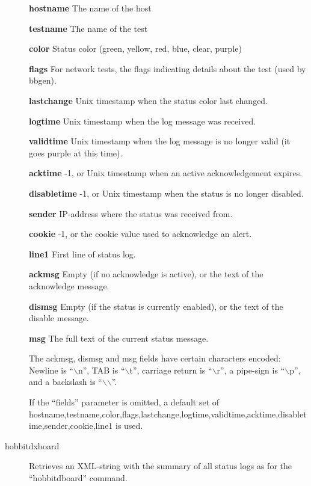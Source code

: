 \begin{description}
 \textbf{hostname}
 The name of the host 


 \textbf{testname}
 The name of the test 


 \textbf{color}
 Status color (green, yellow, red, blue, clear, purple) 


 \textbf{flags}
 For network tests, the flags indicating details about the test (used by bbgen). 


 \textbf{lastchange}
 Unix timestamp when the status color last changed. 


 \textbf{logtime}
 Unix timestamp when the log message was received. 


 \textbf{validtime}
 Unix timestamp when the log message is no longer valid (it goes purple at this time). 


 \textbf{acktime}
 -1, or Unix timestamp when an active acknowledgement expires. 


 \textbf{disabletime}
 -1, or Unix timestamp when the status is no longer disabled. 


 \textbf{sender}
 IP-address where the status was received from. 


 \textbf{cookie}
 -1, or the cookie value used to acknowledge an alert. 


 \textbf{line1}
 First line of status log. 


 \textbf{ackmsg}
 Empty (if no acknowledge is active), or the text of the acknowledge message. 


 \textbf{dismsg}
 Empty (if the status is currently enabled), or the text of the disable message. 


 \textbf{msg}
 The full text of the current status message. 


  The ackmsg, dismsg and msg fields have certain characters encoded:
  Newline is ``$\backslash$n'', TAB is ``$\backslash$t'', carriage
  return is ``$\backslash$r'', a pipe-sign is ``$\backslash$p'', and a
  backslash is ``$\backslash$$\backslash$''. 



  If the ``fields'' parameter is omitted, a default set of
  hostname,testname,color,flags,lastchange,logtime,validtime,acktime,disabletime,sender,cookie,line1
  is used. 



 

\item[hobbitdxboard] Retrieves an XML-string with the summary of all
  status logs as for the ``hobbitdboard'' command. 



\end{description}
